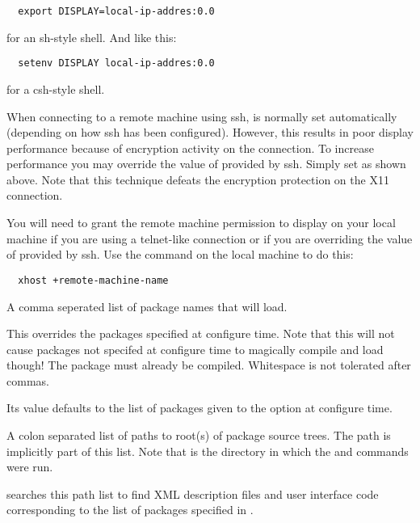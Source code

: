\begin{description}
\begin{verbatim}
  export DISPLAY=local-ip-addres:0.0
\end{verbatim}
  
  for an sh-style shell. And like this:

\begin{verbatim}
  setenv DISPLAY local-ip-addres:0.0
\end{verbatim}

  for a csh-style shell.

  When connecting to a remote machine using ssh,  is
  normally set automatically (depending on how ssh has been
  configured).  However, this results in poor display performance
  because of encryption activity on the connection.  To increase
  performance you may override the value of  provided
  by ssh.  Simply set  as
  shown above.  Note that this technique defeats the encryption
  protection on the X11 connection.

  You will need to grant the remote machine permission to display on
  your local machine if you are using a telnet-like connection or if
  you are overriding the value of  provided by ssh.
  Use the  command on the local machine to do
  this:

\begin{verbatim}
  xhost +remote-machine-name
\end{verbatim}

  
  A comma seperated list of package names that \sr{} will load.
  
  This overrides the packages specified at configure time.  Note
  that this will not cause packages not specifed at configure time
  to magically compile and load though!  The package must already be
  compiled.  Whitespace is not tolerated after commas.
  
  Its value defaults to the list of packages given to the
   option at configure time.
  
  
  A colon separated list of paths to root(s) of package source trees.
  The path  is implicitly part
  of this list.  Note that  is the directory in
  which the  and  commands were run.
  
  \sr{} searches this path list to find XML description files and
  user interface code corresponding to the list of packages
  specified in .
  

\end{description}
